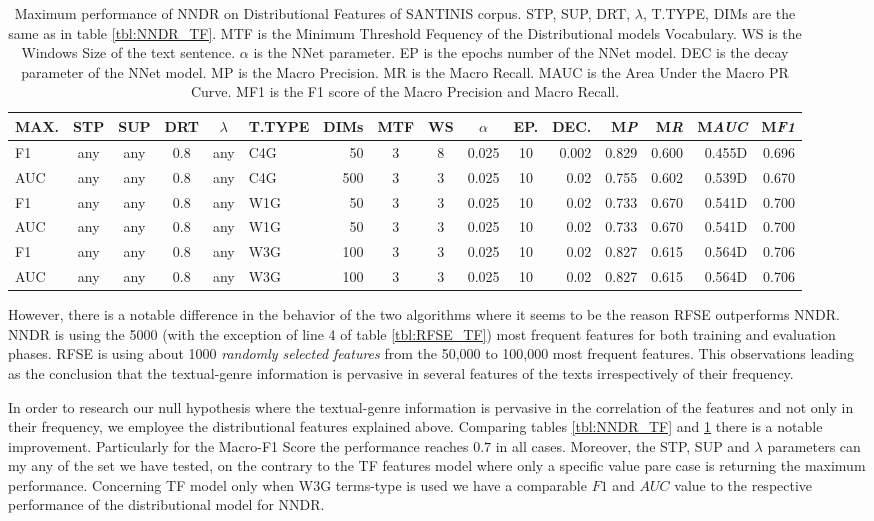 \begin{table}
\center
\begin{tabular}{|l|cccc|lr|ccccr|rrrr|}
\hline
MAX. & STP & SUP & DRT & $\lambda$ & T.TYPE & DIMs & MTF & WS & $\alpha$ & EP. & DEC. & M\emph{P} & M\emph{R} & M\emph{AUC} & M\emph{F1} \\
\hline
F1 & any & any & 0.8 & any & C4G & 50 & 3 & 8 & 0.025 & 10 & 0.002 & 0.829 & 0.600 & 0.455D & 0.696 \\
AUC & any & any & 0.8 & any & C4G & 500 & 3 & 3 & 0.025 & 10 & 0.02 & 0.755 & 0.602 & 0.539D & 0.670 \\
F1 & any & any & 0.8 & any & W1G & 50 & 3 & 3 & 0.025 & 10 & 0.02 & 0.733 & 0.670 & 0.541D & 0.700 \\
AUC & any & any & 0.8 & any & W1G & 50 & 3 & 3 & 0.025 & 10 & 0.02 & 0.733 & 0.670 & 0.541D & 0.700 \\
F1 & any & any & 0.8 & any & W3G & 100 & 3 & 3 & 0.025 & 10 & 0.02 & 0.827 & 0.615 & 0.564D & 0.706 \\
AUC & any & any & 0.8 & any & W3G & 100 & 3 & 3 & 0.025 & 10 & 0.02 & 0.827 & 0.615 & 0.564D & 0.706 \\
\hline
\end{tabular}
\caption {Maximum performance of NNDR on Distributional Features of SANTINIS corpus. STP, SUP, DRT, $\lambda$, T.TYPE, DIMs are the same as in table \ref{tbl:NNDR_TF}. MTF is the Minimum Threshold Fequency of the Distributional models Vocabulary. WS is the Windows Size of the text sentence. $\alpha$ is the NNet parameter. EP is the epochs number of the NNet model. DEC is the decay parameter of the NNet model. MP is the Macro Precision. MR is the Macro Recall. MAUC is the Area Under the Macro PR Curve. MF1 is the F1 score of the Macro Precision and Macro Recall.}
\label{tbl:NNDR_Gensim}
\end{table}




However, there is a notable difference in the behavior of the two algorithms where it seems to be the reason RFSE outperforms NNDR. NNDR is using the 5000 (with the exception of line 4 of table \ref{tbl:RFSE_TF}) most frequent features for both training and evaluation phases. RFSE is using about 1000 \textit{randomly selected features} from the 50,000 to 100,000 most frequent features. This observations leading as the conclusion that the textual-genre information is pervasive in several features of the texts irrespectively of their frequency.

In order to research our null hypothesis where the textual-genre information is pervasive in the correlation of the features and not only in their frequency, we employee the distributional features explained above. Comparing tables \ref{tbl:NNDR_TF} and \ref{tbl:NNDR_Gensim} there is a notable improvement. Particularly for the Macro-F1 Score the performance reaches $0.7$ in all cases. Moreover, the STP, SUP and $\lambda$ parameters can my any of the set we have tested, on the contrary to the TF features model where only a specific value pare case is returning the maximum performance. Concerning TF model only when W3G terms-type is used we have a comparable $F1$ and $AUC$ value to the respective performance of the distributional model for NNDR.

